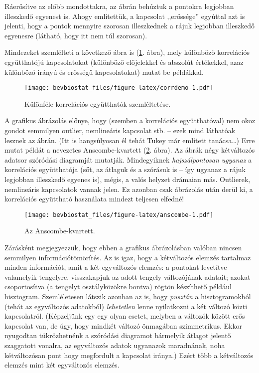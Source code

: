 \documentclass[]{book}
\begin{document}
Ráerősítve az előbb mondottakra, az ábrán behúztuk a pontokra legjobban
illeszkedő egyenest is. Ahogy említettük, a kapcsolat ,,erőssége''
egyúttal azt is jelenti, hogy a pontok mennyire szorosan illeszkednek a
rájuk legjobban illeszkedő egyenesre (látható, hogy itt nem túl
szorosan).

Mindezeket szemlélteti a következő ábra is (\ref{fig:corrdemo}. ábra),
mely különböző korrelációs együtthatójú kapcsolatokat (különböző
előjelekkel és abszolút értékekkel, azaz különböző irányú és erősségű
kapcsolatokat) mutat be példákkal.

\begin{figure}
\centering
\texttt{[image: bevbiostat\_files/figure-latex/corrdemo-1.pdf]}
\caption{\label{fig:corrdemo}Különféle korrelációs együtthatók
szemléltetése.}
\end{figure}

A grafikus ábrázolás előnye, hogy (szemben a korrelációs együtthatóval)
nem okoz gondot semmilyen outlier, nemlineáris kapcsolat stb. -- ezek
mind láthatóak lesznek az ábrán. (Itt is hangsúlyosan él tehát Tukey már
említett tanácsa\dots{}) Erre mutat példát a nevezetes Anscombe-kvartett
(\ref{fig:anscombe}. ábra). Az ábrák négy kétváltozós adatsor szóródási
diagramját mutatják. Mindegyiknek \emph{hajszálpontosan ugyanaz} a
korrelációs együtthatója (sőt, az átlaguk és a szórásuk is -- így
ugyanaz a rájuk legjobban illeszkedő egyenes is), mégis, a valós helyzet
drámaian más. Outlierek, nemlineáris kapcsolatok vannak jelen. Ez
azonban csak ábrázolás után derül ki, a korrelációs együttható
használata mindezt teljesen elfedné!

\begin{figure}
\centering
\texttt{[image: bevbiostat\_files/figure-latex/anscombe-1.pdf]}
\caption{\label{fig:anscombe}Az Anscombe-kvartett.}
\end{figure}

Zárásként megjegyezzük, hogy ebben a grafikus ábrázolásban valóban
nincsen semmilyen információtömörítés. Az is igaz, hogy a kétváltozós
elemzés tartalmaz minden információt, amit a két egyváltozós elemzés: a
pontokat levetítve valamelyik tengelyre, visszakapjuk az adott tengely
változójának adatait; azokat csoportosítva (a tengelyt osztályközökre
bontva) rögtön készíthető például hisztogram. Szemléletesen látszik
azonban az is, hogy \emph{pusztán} a hisztogramokból (tehát az
egyváltozós adatokból) \emph{lehetetlen} lenne nyilatkozni a két változó
közti kapcsolatról. (Képzeljünk egy egy olyan esetet, melyben a változók
között erős kapcsolat van, de úgy, hogy mindkét változó önmagában
szimmetrikus. Ekkor nyugodtan tükrözhetnénk a szóródási diagramot
bármelyik átlagot jelentő szaggatott vonalra, az egyváltozós adatok
ugyanazok maradnának, noha kétváltozósan pont hogy megfordult a
kapcsolat iránya.) Ezért több a kétváltozós elemzés mint két egyváltozós
elemzés.
\end{document}
